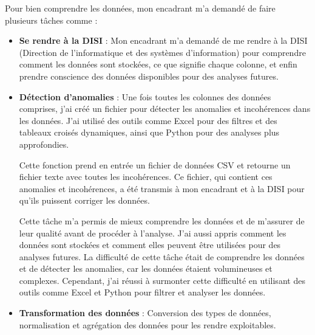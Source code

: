 Pour bien comprendre les données, mon encadrant m'a demandé de faire plusieurs tâches comme : 
\begin{itemize}
    \item \textbf{Se rendre à la DISI} : Mon encadrant m'a demandé de me rendre à la DISI (Direction de l'informatique et des systèmes d'information) pour comprendre comment les données sont stockées, ce que signifie chaque colonne, et enfin prendre conscience des données disponibles pour des analyses futures.  
    \item \textbf{Détection d'anomalies} : Une fois toutes les colonnes des données comprises, j'ai créé un fichier pour détecter les anomalies et incohérences dans les données. J'ai utilisé des outils comme Excel pour des filtres et des tableaux croisés dynamiques, ainsi que Python pour des analyses plus approfondies. 

    Cette fonction prend en entrée un fichier de données CSV et retourne un fichier texte avec toutes les incohérences.  
    Ce fichier, qui contient ces anomalies et incohérences, a été transmis à mon encadrant et à la DISI pour qu'ils puissent corriger les données.

    Cette tâche m'a permis de mieux comprendre les données et de m'assurer de leur qualité avant de procéder à l'analyse. J'ai aussi appris comment les données sont stockées et comment elles peuvent être utilisées pour des analyses futures.  
    La difficulté de cette tâche était de comprendre les données et de détecter les anomalies, car les données étaient volumineuses et complexes. Cependant, j'ai réussi à surmonter cette difficulté en utilisant des outils comme Excel et Python pour filtrer et analyser les données.

    \item \textbf{Transformation des données} : Conversion des types de données, normalisation et agrégation des données pour les rendre exploitables. 
\end{itemize}


